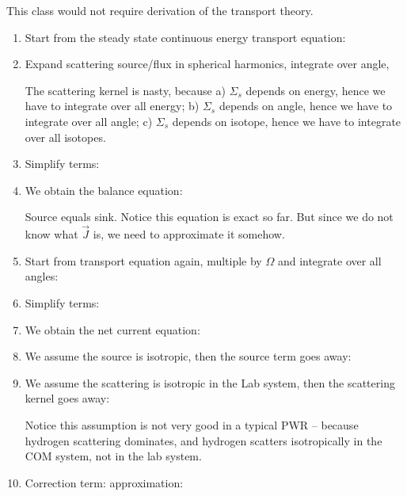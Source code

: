 \documentclass{school-22.211-notes}
\date{March 19, 2012}
\begin{document}
\maketitle

This class would not require derivation of the transport theory. 
\begin{enumerate}
\item Start from the steady state continuous energy transport equation: 

\item Expand scattering source/flux in spherical harmonics, integrate over angle,


The scattering kernel is nasty, because a) $\Sigma_s$ depends on energy, hence we have to integrate over all energy; b) $\Sigma_s$ depends on angle, hence we have to integrate over all angle; c) $\Sigma_s$ depends on isotope, hence we have to integrate over all isotopes. 

\item Simplify terms: 


\item We obtain the balance equation:

Source equals sink. Notice this equation is exact so far. But since we do not know what $\vec{J}$ is, we need to approximate it somehow. 

\item Start from transport equation again, multiple by $\Omega$ and integrate over all angles: 


\item Simplify terms:

\item We obtain the net current equation:

\item We assume the source is isotropic, then the source term goes away:

\item We assume the scattering is isotropic in the Lab system, then the scattering kernel goes away:

Notice this assumption is not very good in a typical PWR -- because hydrogen scattering dominates, and hydrogen scatters isotropically in the COM system, not in the lab system. 

\item Correction term:  approximation: 

\end{enumerate}
\end{document}
